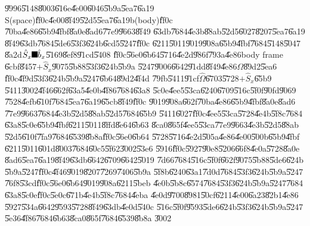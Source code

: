 \documentclass[12pt,a4paper]{article}
\begin{document}
\U{9996}\U{5148}\U{8003}\U{616e}\U{4e00}\U{6046}\U{5b9a}\U{5ea7}\U{6a19}%
S(space)\U{ff0c}\U{4e00}\U{8f49}\U{52d5}\U{5ea7}\U{6a19}b(body)\U{ff0c}%
\U{70ba}\U{4e86}\U{65b9}\U{4fbf}\U{8a0e}\U{8ad6}\U{77e9}\U{9663}\U{8f49}%
\U{63db}\U{7684}\U{4e3b}\U{88ab}\U{52d5}\U{6027}\U{8207}\U{5ea7}\U{6a19}%
\U{8f49}\U{63db}\U{7684}\U{5de6}\U{53f3}\U{624b}\U{6cd5}\U{5247}\U{ff0c}%
\U{6211}\U{5011}\U{9019}\U{908a}\U{65b9}\U{4fbf}\U{7684}\U{5148}\U{5047}%
\U{8a2d}$\hat{S}_{x}\U{ff0c} \hat{b}_{x}$\U{5169}\U{8ef8}\U{91cd}\U{5408}%
\U{ff0c}\U{56e0}\U{6b64}\U{5716}\U{4e2d}\U{986f}\U{793a}\U{4e86}body frame%
\U{6cbf}\U{8457}$+\hat{S}_{x}$\U{9075}\U{5b88}\U{53f3}\U{624b}\U{5b9a}%
\U{5247}\U{9006}\U{6642}\U{91dd}\U{8f49}\U{4e86}$\Omega $\U{89d2}\U{5ea6}%
\U{ff0c}\U{4f9d}\U{53f3}\U{624b}\U{5b9a}\U{5247}\U{6b64}\U{89d2}\U{4f4d}%
\U{79fb}\U{5411}\U{91cf}$\hat{\Omega}$\U{6703}\U{5728}$+\hat{S}_{x}$\U{65b9}%
\U{5411}\U{3002}\U{4f46}\U{662f}\U{63a5}\U{4e0b}\U{4f86}\U{7684}\U{63a8}%
\U{5c0e}\U{4ee5}\U{53ca}\U{6240}\U{6709}\U{516c}\U{5f0f}\U{90fd}\U{9069}%
\U{7528}\U{4efb}\U{610f}\U{7684}\U{5ea7}\U{6a19}\U{65cb}\U{8f49}\U{ff0c}%
\U{9019}\U{908a}\U{662f}\U{70ba}\U{4e86}\U{65b9}\U{4fbf}\U{8a0e}\U{8ad6}%
\U{77e9}\U{9663}\U{7684}\U{4e3b}\U{52d5}\U{88ab}\U{52d5}\U{7684}\U{65b9}%
\U{5411}\U{6027}\U{ff0c}\U{4ee5}\U{53ca}\U{5728}\U{4e4b}\U{5f8c}\U{7684}%
\U{63a8}\U{5c0e}\U{65b9}\U{4fbf}\U{6211}\U{5011}\U{8ffd}\U{8e64}\U{6b63}%
\U{8ca0}\U{865f}\U{4ee5}\U{53ca}\U{77e9}\U{9663}\U{4e3b}\U{52d5}\U{88ab}%
\U{52d5}\U{610f}\U{7fa9}\U{7684}\U{6539}\U{8b8a}\U{ff0c}\U{56e0}\U{6b64}%
\U{5728}\U{5716}\U{4e2d}\U{505a}\U{4e86}\U{4e00}\U{500b}\U{65b9}\U{4fbf}%
\U{6211}\U{5011}\U{601d}\U{8003}\U{7684}\U{60c5}\U{5f62}\U{3002}\U{53e6}%
\U{5916}\U{ff0c}\U{5927}\U{90e8}\U{5206}\U{66f8}\U{4e0a}\U{5728}\U{8a0e}%
\U{8ad6}\U{5ea7}\U{6a19}\U{8f49}\U{63db}\U{6642}\U{6709}\U{6642}\U{5019}%
\U{7d66}\U{7684}\U{516c}\U{5f0f}\U{662f}\U{9075}\U{5b88}\U{5de6}\U{624b}%
\U{5b9a}\U{5247}\U{ff0c}\U{4f46}\U{9019}\U{8207}\U{7269}\U{7406}\U{5b9a}%
\U{5f8b}\U{6240}\U{63a1}\U{7d0d}\U{7684}\U{53f3}\U{624b}\U{5b9a}\U{5247}%
\U{76f8}\U{53cd}\U{ff0c}\U{56e0}\U{6b64}\U{9019}\U{908a}\U{6211}\U{5beb}%
\U{4e0b}\U{5b8c}\U{6574}\U{7684}\U{53f3}\U{624b}\U{5b9a}\U{5247}\U{7684}%
\U{63a8}\U{5c0e}\U{ff0c}\U{5e0c}\U{671b}\U{4e4b}\U{5f8c}\U{7684}\U{4eba}%
\U{4e0d}\U{9700}\U{8981}\U{50cf}\U{6211}\U{4e00}\U{6a23}\U{82b1}\U{4e86}%
\U{5927}\U{534a}\U{6642}\U{9593}\U{5728}\U{8f49}\U{63db}\U{4e0d}\U{540c}%
\U{516c}\U{5f0f}\U{9593}\U{5de6}\U{624b}\U{53f3}\U{624b}\U{5b9a}\U{5247}%
\U{5e36}\U{4f86}\U{7684}\U{6b63}\U{8ca0}\U{865f}\U{7684}\U{6539}\U{8b8a}%
\U{3002}
\end{document}
